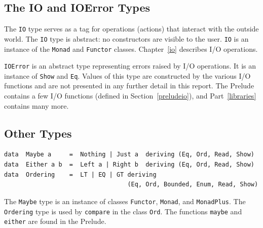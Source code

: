 \subsection{The IO and IOError Types}
The \mbox{\tt IO} type serves as a tag for operations (actions) that interact
with the outside world.  The \mbox{\tt IO} type is abstract: no constructors are
visible to the user.  \mbox{\tt IO} is an instance of the \mbox{\tt Monad} and \mbox{\tt Functor}
classes.  Chapter~\ref{io} describes I/O operations.

\mbox{\tt IOError} is an abstract type representing errors raised by I/O
operations.  It is an instance of \mbox{\tt Show} and \mbox{\tt Eq}.  Values of this type
are constructed by the various I/O functions and are not presented in
any further detail in this report.  The Prelude contains a few
I/O functions (defined in Section~\ref{preludeio}), and Part~\ref{libraries}
contains many more.

\subsection{Other Types}
{\small
\bprog
{\small\begin{verbatim}
data  Maybe a     =  Nothing | Just a  deriving (Eq, Ord, Read, Show)
data  Either a b  =  Left a | Right b  deriving (Eq, Ord, Read, Show)
data  Ordering    =  LT | EQ | GT deriving
                                  (Eq, Ord, Bounded, Enum, Read, Show)
\end{verbatim}}
\eprog
}
The \mbox{\tt Maybe} type is an instance of classes \mbox{\tt Functor}, \mbox{\tt Monad},
and \mbox{\tt MonadPlus}.  The \mbox{\tt Ordering} type is used by \mbox{\tt compare}
in the class \mbox{\tt Ord}. The functions \mbox{\tt maybe} and \mbox{\tt either} are found in
the Prelude.

